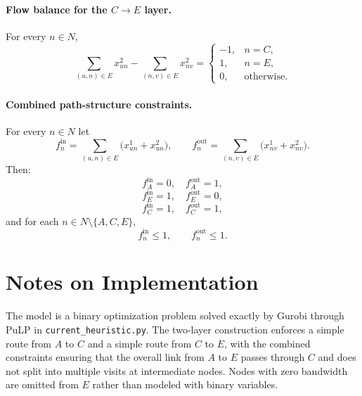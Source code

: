 \paragraph{Flow balance for the $C\to E$ layer.}
For every $n\in N$,
\[
\sum_{(u,n)\in E} x^{2}_{un}-\sum_{(n,v)\in E} x^{2}_{nv}=
\begin{cases}
-1, & n=C,\\
1, & n=E,\\
0, & \text{otherwise}.
\end{cases}
\]

\paragraph{Combined path-structure constraints.}
For every $n\in N$ let
\[
f_n^{\text{in}}=\sum_{(u,n)\in E}\bigl(x^{1}_{un}+x^{2}_{un}\bigr),\qquad
f_n^{\text{out}}=\sum_{(n,v)\in E}\bigl(x^{1}_{nv}+x^{2}_{nv}\bigr).
\]
Then:
\[
f_A^{\text{in}}=0,\quad f_A^{\text{out}}=1,
\]
\[
f_E^{\text{in}}=1,\quad f_E^{\text{out}}=0,
\]
\[
f_C^{\text{in}}=1,\quad f_C^{\text{out}}=1,
\]
and for each $n\in N\setminus\{A,C,E\}$,
\[
f_n^{\text{in}}\le 1,\qquad f_n^{\text{out}}\le 1.
\]

\section*{Notes on Implementation}
The model is a binary optimization problem solved exactly by Gurobi through PuLP in \texttt{current\_heuristic.py}. The two-layer construction enforces a simple route from $A$ to $C$ and a simple route from $C$ to $E$, with the combined constraints ensuring that the overall link from $A$ to $E$ passes through $C$ and does not split into multiple visits at intermediate nodes. Nodes with zero bandwidth are omitted from $E$ rather than modeled with binary variables.
